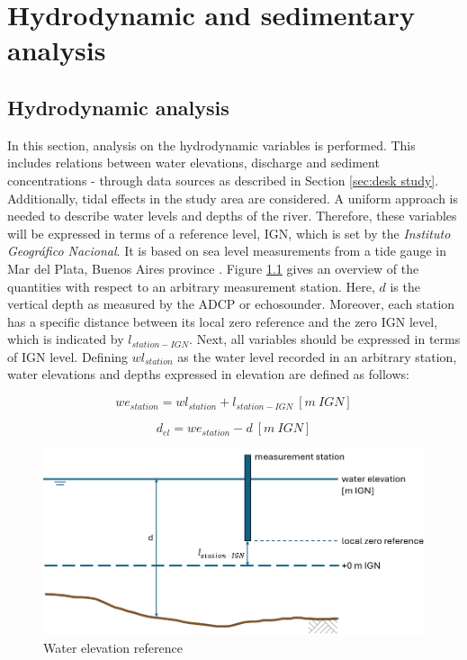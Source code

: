 \chapter{Hydrodynamic and sedimentary analysis}
\label{chap:hydroanalysis}
\section{Hydrodynamic analysis}
\label{sec:Hydrodynamic data}
In this section, analysis on the hydrodynamic variables is performed. This includes relations between water elevations, discharge and sediment concentrations - through data sources as described in Section \ref{sec:desk study}. Additionally, tidal effects in the study area are considered. A uniform approach is needed to describe water levels and depths of the river. Therefore, these variables will be expressed in terms of a reference level, IGN, which is set by the \textit{Instituto Geográfico Nacional}. It is based on sea level measurements from a tide gauge in Mar del Plata, Buenos Aires province \autocite{donofrioReferenciaVertical1999}. Figure \ref{fig:waterelevationreference} gives an overview of the quantities with respect to an arbitrary measurement station. Here, $d$ is the vertical depth as measured by the ADCP or echosounder. Moreover, each station has a specific distance between its local zero reference and the zero IGN level, which is indicated by $l_{station-IGN}$. Next, all variables should be expressed in terms of IGN level. Defining $wl_{station}$ as the water level recorded in an arbitrary station, water elevations and depths expressed in elevation are defined as follows:

\begin{equation}
    we_{station} = wl_{station} + l_{station-IGN} ~[m~IGN]
\end{equation}

\begin{equation}
    d_{el} = we_{station}-d ~[m~IGN]
\end{equation}


\begin{figure}[H]
    \centering
    \includegraphics[width=0.75\linewidth]{figures/ch5/waterelevations.png}
    \caption{Water elevation reference}
    \label{fig:waterelevationreference}
\end{figure}


